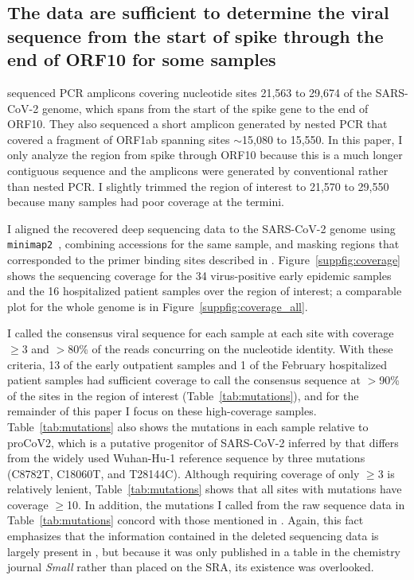 \documentclass[9pt,twocolumn,twoside]{gsajnl_modified}
\begin{document}
\subsection{The data are sufficient to determine the viral sequence from the start of spike through the end of ORF10 for some samples}
\citet{wang2020medRxiv} sequenced PCR amplicons covering nucleotide sites 21,563 to 29,674 of the SARS-CoV-2 genome, which spans from the start of the spike gene to the end of ORF10.
They also sequenced a short amplicon generated by nested PCR that covered a fragment of ORF1ab spanning sites $\sim$15,080 to 15,550.
In this paper, I only analyze the region from spike through ORF10 because this is a much longer contiguous sequence and the amplicons were generated by conventional rather than nested PCR.
I slightly trimmed the region of interest to 21,570 to 29,550 because many samples had poor coverage at the termini.

I aligned the recovered deep sequencing data to the SARS-CoV-2 genome using \texttt{minimap2}~\citep{li2018minimap2}, combining accessions for the same sample, and masking regions that corresponded to the primer binding sites described in \citet{wang2020medRxiv}.
Figure~\ref{suppfig:coverage} shows the sequencing coverage for the 34 virus-positive early epidemic samples and the 16 hospitalized patient samples over the region of interest; a comparable plot for the whole genome is in Figure~\ref{suppfig:coverage_all}.

I called the consensus viral sequence for each sample at each site with coverage $\ge$3 and $>$80\% of the reads concurring on the nucleotide identity.
With these criteria, 13 of the early outpatient samples and 1 of the February hospitalized patient samples had sufficient coverage to call the consensus sequence at $>$90\% of the sites in the region of interest (Table~\ref{tab:mutations}), and for the remainder of this paper I focus on these high-coverage samples.
Table~\ref{tab:mutations} also shows the mutations in each sample relative to proCoV2, which is a putative progenitor of SARS-CoV-2 inferred by \citet{kumar2021evolutionary} that differs from the widely used Wuhan-Hu-1 reference sequence by three mutations (C8782T, C18060T, and T28144C).
Although requiring coverage of only $\ge$3 is relatively lenient, Table~\ref{tab:mutations} shows that all sites with mutations have coverage $\ge$10.
In addition, the mutations I called from the raw sequence data in Table~\ref{tab:mutations} concord with those mentioned in \citet{wang2020small}.
Again, this fact emphasizes that the information contained in the deleted sequencing data is largely present in \citet{wang2020small}, but because it was only published in a table in the chemistry journal \textit{Small} rather than placed on the SRA, its existence was overlooked.
\end{document}

